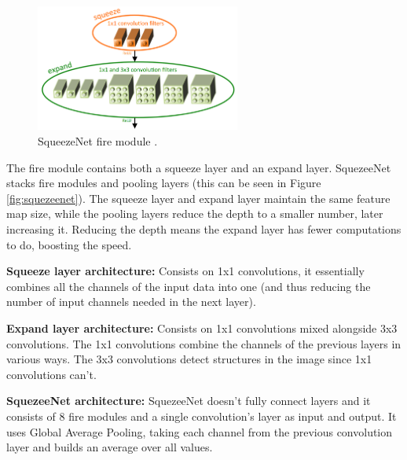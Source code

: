     \begin{figure}[H]
        \centering
        \captionsetup{justification=centering}
        \includegraphics[width=0.6\textwidth]{Sections/2StateOfTheArt/2_images/firemodule.png}
        \caption[SqueezeNet fire module]{SqueezeNet fire module \cite{Iandola2016}.}  
        \label{fig:firemodule}
    \end{figure}
    
    The fire module contains both a squeeze layer and an expand layer. SquezeeNet stacks fire modules and pooling layers  (this can be seen in Figure \ref{fig:squezeenet}). The squeeze layer and expand layer maintain the same feature map size, while the pooling layers reduce the depth to a smaller number, later increasing it. Reducing the depth means the expand layer has fewer computations to do, boosting the speed.\par


    \hfill
    
   \textbf{Squeeze layer architecture: } Consists on 1x1 convolutions, it essentially combines all the channels of the input data into one (and thus reducing the number of input channels needed in the next layer).\par
   \hfill

   \textbf{Expand layer architecture:} Consists on 1x1 convolutions mixed alongside 3x3 convolutions. The 1x1 convolutions combine the channels of the previous layers in various ways. The 3x3 convolutions detect structures in the image since 1x1 convolutions can’t. \par
   \hfill

   \textbf{SquezeeNet architecture:} SquezeeNet doesn’t fully connect layers and it consists of 8 fire modules and a single convolution's layer as input and output. It uses Global Average Pooling, taking each channel from the previous convolution layer and builds an average over all values.




